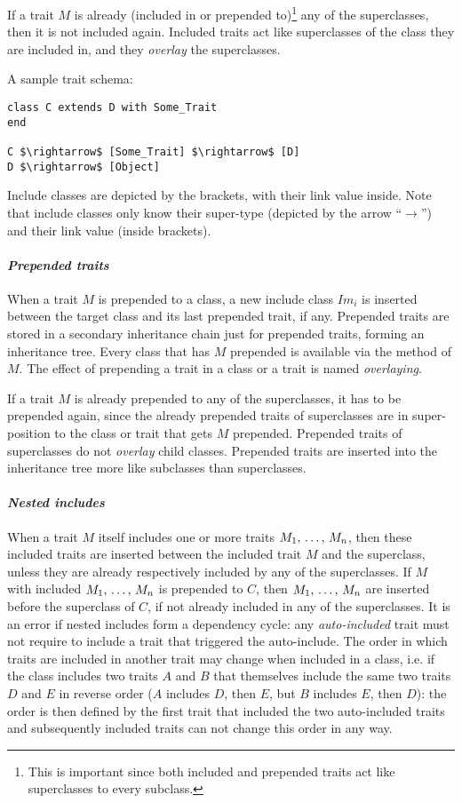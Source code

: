 If a trait $M$ is already (included in or prepended to)\footnote{This is important since both included and prepended traits act like superclasses to every subclass.} any of the superclasses, then it is not included again. Included traits act like superclasses of the class they are included in, and they {\em overlay} the superclasses. 

\example A sample trait schema:
\begin{lstlisting}
class C extends D with Some_Trait
end

C $\rightarrow$ [Some_Trait] $\rightarrow$ [D]
D $\rightarrow$ [Object]
\end{lstlisting}
Include classes are depicted by the brackets, with their link value inside. Note that include classes only know their super-type (depicted by the arrow ``$\rightarrow$'') and their link value (inside brackets). 

\paragraph{\em Prepended traits}
When a trait $M$ is prepended to a class, a new include class $Im_i$ is inserted between the target class and its last prepended trait, if any. Prepended traits are stored in a secondary inheritance chain just for prepended traits, forming an inheritance tree. Every class that has $M$ prepended is available via the  method of $M$. The effect of prepending a trait in a class or a trait is named {\em overlaying}. 

If a trait $M$ is already prepended to any of the superclasses, it has to be prepended again, since the already prepended traits of superclasses are in super-position to the class or trait that gets $M$ prepended. Prepended traits of superclasses do not {\em overlay} child classes. Prepended traits are inserted into the inheritance tree more like subclasses than superclasses. 

\paragraph{\em Nested includes}
When a trait $M$ itself includes one or more traits $M_1 ,\, \ldots ,\, M_n$, then these included traits are inserted between the included trait $M$ and the superclass, unless they are already respectively included by any of the superclasses. If $M$ with included $M_1 ,\, \ldots ,\, M_n$ is prepended to $C$, then $M_1 ,\, \ldots ,\, M_n$ are inserted before the superclass of $C$, if not already included in any of the superclasses. It is an error if nested includes form a dependency cycle: any {\em auto-included} trait must not require to include a trait that triggered the auto-include. The order in which traits are included in another trait may change when included in a class, i.e. if the class includes two traits $A$ and $B$ that themselves include the same two traits $D$ and $E$ in reverse order ($A$ includes $D$, then $E$, but $B$ includes $E$, then $D$): the order is then defined by the first trait that included the two auto-included traits and subsequently included traits can not change this order in any way. 

